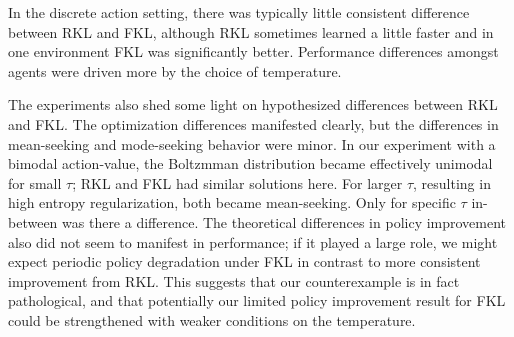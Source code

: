 \documentclass[twoside,11pt]{article}
\begin{document}
In the discrete action setting, there was typically little consistent difference between RKL and FKL, although RKL sometimes learned a little faster and in one environment FKL was significantly better. Performance differences amongst agents were driven more by the choice of temperature. 

The experiments also shed some light on hypothesized differences between RKL and FKL. The optimization differences manifested clearly, but the differences in mean-seeking and mode-seeking behavior were minor. In our experiment with a bimodal action-value, the Boltzmman distribution became effectively unimodal for small $\tau$; RKL and FKL had similar solutions here. For larger $\tau$, resulting in high entropy regularization, both became mean-seeking. Only for specific $\tau$ in-between was there a difference. The theoretical differences in policy improvement also did not seem to manifest in performance; if it played a large role, we might expect periodic policy degradation under FKL in contrast to more consistent improvement from RKL. This suggests that our counterexample is in fact pathological, and that potentially our limited policy improvement result for FKL could be strengthened with weaker conditions on the temperature.

%
\end{document}
